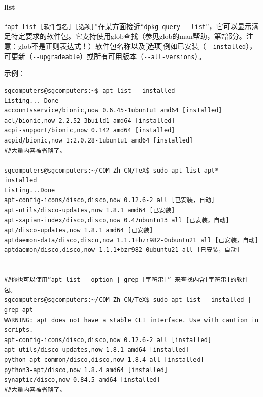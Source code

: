 \paragraph{list}
“\verb|apt list [软件包名] [选项]|”在某方面接近“\verb|dpkg-query --list|”，它可以显示满足特定要求的软件包。它支持使用glob查找（参见glob的man帮助，第7部分。注意：glob不是正则表达式！）软件包名称以及[选项]例如已安装（\verb|--installed|），可更新（\verb|--upgradeable|）或所有可用版本（\verb|--all-versions|）。\par
示例：
\begin{verbatim}
sgcomputers@sgcomputers:~$ apt list --installed
Listing... Done
accountsservice/bionic,now 0.6.45-1ubuntu1 amd64 [installed]
acl/bionic,now 2.2.52-3build1 amd64 [installed]
acpi-support/bionic,now 0.142 amd64 [installed]
acpid/bionic,now 1:2.0.28-1ubuntu1 amd64 [installed]
##大量内容被省略了。

sgcomputers@sgcomputers:~/COM_Zh_CN/TeX$ sudo apt list apt*  --installed 
Listing...Done
apt-config-icons/disco,disco,now 0.12.6-2 all [已安装，自动]
apt-utils/disco-updates,now 1.8.1 amd64 [已安装]
apt-xapian-index/disco,disco,now 0.47ubuntu13 all [已安装，自动]
apt/disco-updates,now 1.8.1 amd64 [已安装]
aptdaemon-data/disco,disco,now 1.1.1+bzr982-0ubuntu21 all [已安装，自动]
aptdaemon/disco,disco,now 1.1.1+bzr982-0ubuntu21 all [已安装，自动]


##你也可以使用“apt list --option | grep [字符串]” 来查找内含[字符串]的软件包。
sgcomputers@sgcomputers:~/COM_Zh_CN/TeX$ sudo apt list --installed | grep apt
WARNING: apt does not have a stable CLI interface. Use with caution in scripts.
apt-config-icons/disco,disco,now 0.12.6-2 all [installed]
apt-utils/disco-updates,now 1.8.1 amd64 [installed]
python-apt-common/disco,disco,now 1.8.4 all [installed]
python3-apt/disco,now 1.8.4 amd64 [installed]
synaptic/disco,now 0.84.5 amd64 [installed]
##大量内容被省略了。
\end{verbatim}
